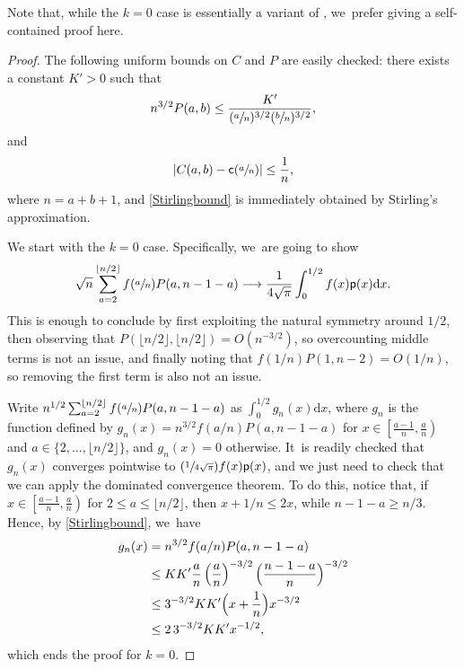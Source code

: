 \documentclass[JEP,XML,SOM,Unicode,NoFloatCountersInSection, NoEqCountersInSection,published]{cedram}
\newcommand{\Psfrac}[2]{(\sfrac{#1}{#2})}
\newcommand{\pp}{\mathsf{p}}
\newcommand{\cc}{\mathsf{c}}\let\ff\cc
\newcommand{\dd}{\mathrm{d}}
\theoremstyle{definition}
\begin{document}
Note that, while the $k=0$ case is essentially a variant of \cite[Prop.\,39]{HM12}, we~prefer giving a self-contained proof here.
\begin{proof} The following uniform bounds on $C$ and $P$ are easily checked: there exists a constant $K'>0$ such that
\begin{equation}\label{Stirlingbound}
n^{3/2} P(a,b) \leq \frac{K'}{(\sfrac{a}{n})^{3/2}(\sfrac{b}{n})^{3/2}},
\end{equation}
and
\begin{equation}\label{eq:boundc1}
\left|C(a,b)-\cc{\left(\sfrac{a}{n}\right)}\right|\leq\frac1n,
\end{equation}
where $n=a+b+1$, and \eqref{Stirlingbound} is immediately obtained by Stirling's approximation.

We start with the $k=0$ case. Specifically, we~are going to show
\[
\sqrt{n} \sum_{a=2}^{\lfloor n/2\rfloor} f{(\sfrac{a}{n})}P(a,n-1-a) \longrightarrow \frac{1}{4\sqrt{\pi}}\int_0^{1/2} f(x) \pp(x) \dd x.
\]
This is enough to conclude by first exploiting the natural symmetry around $1/2$, then observing that $P(\lfloor n/2\rfloor,\lfloor n/2 \rfloor)=O(n^{-3/2})$, so overcounting middle terms is not an issue, and finally noting that $f(1/n)P(1,n-2)=O(1/n)$, so removing the first term is also not an issue.

Write $n^{1/2}\sum_{a=2}^{\lfloor n/2\rfloor} f(\sfrac{a}{n})P(a,n-1-a)$ as $\int_{0}^{1/2} g_n(x)\mathrm{d}x$, where $g_n$ is the function defined by $g_n(x)=n^{3/2}f(a/n)P(a,n-1-a)$ for $x\in \left[\frac{a-1}{n},\frac{a}{n}\right)$ and $a\in \{2,\ldots,\lfloor n/2\rfloor\}$, and $g_n(x)=0$ otherwise. It~is readily checked that $g_n(x)$ converges pointwise to $\Psfrac1{4\sqrt{\pi}}f(x) \pp(x)$, and we just need to check that we can apply the dominated convergence theorem. To do this, notice that, if $x\in \left[\frac{a-1}{n},\frac{a}{n}\right)$ for $2\leq a \leq \lfloor n/2\rfloor$, then $x+1/n\leq 2x$, while $n-1-a\geq n/3$. Hence, by \eqref{Stirlingbound}, we~have
\begin{align*}
g_n(x)& =n^{3/2}f(a/n)P(a,n-1-a) \\
&\leq KK'\frac{a}{n} \left(\frac{a}{n}\right)^{-3/2}\Bigl(\frac{n-1-a}{n}\Bigr)^{-3/2} \\
&\leq 3^{-3/2}KK' \Bigl(x+\frac{1}{n}\Bigr)x^{-3/2} \\
&\leq 2\,3^{-3/2}KK'x^{-1/2},
\end{align*}
which ends the proof for $k=0$.


\end{proof}
\end{document}
